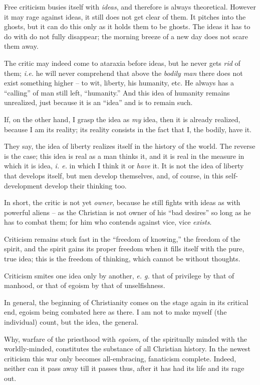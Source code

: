 \documentclass[12pt,a4paper]{book}
\begin{document}
Free criticism busies itself with \textit{ideas}, and therefore is always 
theoretical. However it may rage against ideas, it still does not get clear of 
them. It pitches into the ghosts, but it can do this only as it holds them to 
be ghosts. The ideas it has to do with do not fully disappear; the morning 
breeze of a new day does not scare them away.

The critic may indeed come to ataraxia before ideas, but he never gets 
\textit{rid} of them; \textit{i.e.} he will never comprehend that above the 
\textit{bodily man} there does not exist something higher -- to wit, liberty, 
his humanity, etc. He always has a ``calling'' of man still left, 
``humanity.'' And this idea of humanity remains unrealized, just because it 
is an ``idea'' and is to remain such.

If, on the other hand, I grasp the idea as \textit{my} idea, then it is 
already realized, because I am its reality; its reality consists in the fact 
that I, the bodily, have it.

They say, the idea of liberty realizes itself in the history of the world. The 
reverse is the case; this idea is real as a man thinks it, and it is real in 
the measure in which it is idea, \textit{i. e.} in which I think it or 
\textit{have} it. It is not the idea of liberty that develops itself, but men 
develop themselves, and, of course, in this self-development develop their 
thinking too.

In short, the critic is not yet \textit{owner}, because he still fights with 
ideas as with powerful aliens -- as the Christian is not owner of his ``bad 
desires'' so long as he has to combat them; for him who contends against 
vice, vice \textit{exists}.

Criticism remains stuck fast in the ``freedom of knowing,'' the freedom of 
the spirit, and the spirit gains its proper freedom when it fills itself with 
the pure, true idea; this is the freedom of thinking, which cannot be without 
thoughts.

Criticism smites one idea only by another, \textit{e. g.} that of privilege by 
that of manhood, or that of egoism by that of unselfishness.

In general, the beginning of Christianity comes on the stage again in its 
critical end, egoism being combated here as there. I am not to make myself 
(the individual) count, but the idea, the general.

Why, warfare of the priesthood with \textit{egoism}, of the spiritually minded 
with the worldly-minded, constitutes the substance of all Christian history. 
In the newest criticism this war only becomes all-embracing, fanaticism 
complete. Indeed, neither can it pass away till it passes thus, after it has 
had its life and its rage out.
\end{document}
